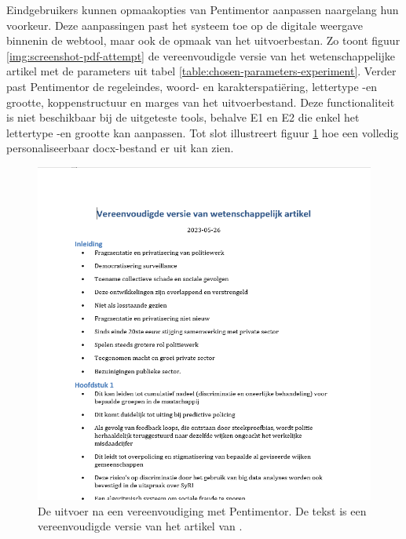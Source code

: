 \medspace

Eindgebruikers kunnen opmaakopties van Pentimentor aanpassen naargelang hun voorkeur. Deze aanpassingen past het systeem toe op de digitale weergave binnenin de webtool, maar ook de opmaak van het uitvoerbestan. Zo toont figuur \ref{img:screenshot-pdf-attempt} de vereenvoudigde versie van het wetenschappelijke artikel met de parameters uit tabel \ref{table:chosen-parameters-experiment}. Verder past Pentimentor de regeleindes, woord- en karakterspatiëring, lettertype -en grootte, koppenstructuur en marges van het uitvoerbestand. Deze functionaliteit is niet beschikbaar bij de uitgeteste tools, behalve E1 en E2 die enkel het lettertype -en grootte kan aanpassen. Tot slot illustreert figuur \ref{img:screenshot-docx-attempt} hoe een volledig personaliseerbaar docx-bestand er uit kan zien.

\begin{figure}[H]
	\includegraphics[width=\linewidth]{img/screenshot-prototype-word.png}
	\caption{De uitvoer na een vereenvoudiging met Pentimentor. De tekst is een vereenvoudigde versie van het artikel van \textcite{VanBrakel2022}.}
	\label{img:screenshot-docx-attempt}
\end{figure}

